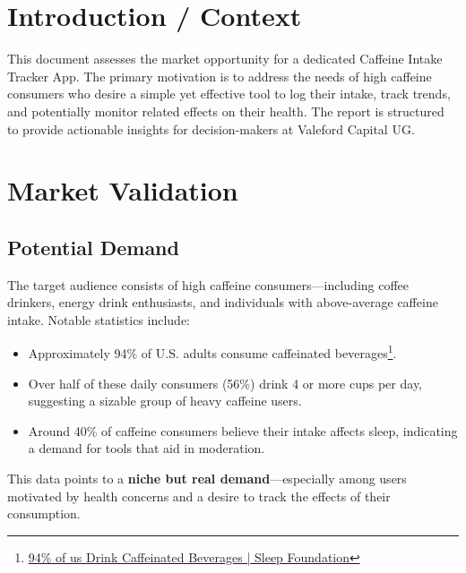 \documentclass[11pt]{article}
\begin{document}
\newpage

\section{Introduction / Context}
This document assesses the market opportunity for a dedicated Caffeine Intake Tracker App. The primary motivation is to address the needs of high caffeine consumers who desire a simple yet effective tool to log their intake, track trends, and potentially monitor related effects on their health. The report is structured to provide actionable insights for decision-makers at Valeford Capital UG.

\section{Market Validation}

\subsection{Potential Demand}
The target audience consists of high caffeine consumers—including coffee drinkers, energy drink enthusiasts, and individuals with above-average caffeine intake. Notable statistics include:
\begin{itemize}[noitemsep]
    \item Approximately 94\% of U.S. adults consume caffeinated beverages\footnote{\href{https://www.sleepfoundation.org/sleep-news/94-percent-of-us-drink-caffeinated-beverages}{94\% of us Drink Caffeinated Beverages | Sleep Foundation}}.
    \item Over half of these daily consumers (56\%) drink 4 or more cups per day, suggesting a sizable group of heavy caffeine users.
    \item Around 40\% of caffeine consumers believe their intake affects sleep, indicating a demand for tools that aid in moderation.
\end{itemize}
This data points to a \textbf{niche but real demand}—especially among users motivated by health concerns and a desire to track the effects of their consumption.
\end{document}
